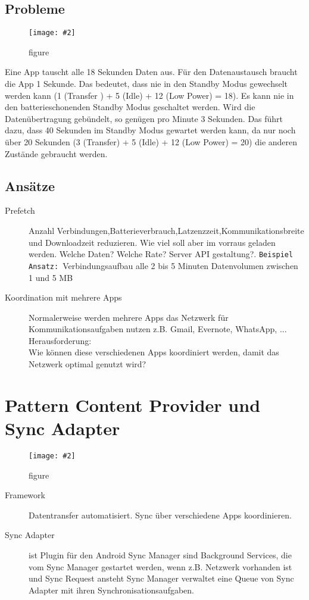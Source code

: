 \documentclass[a4paper,10pt,titlepage=false]{scrreprt}
\newcommand{\pic}[2][figure]{\begin{figure}[h]
 \centering
 \texttt{[image: \#2]}
 \caption{#1}
\end{figure}
}
\begin{document}
\subsection{Probleme}
\pic{rsmp.png}
 Eine App tauscht alle 18 Sekunden Daten aus. Für den Datenaustausch
braucht die App 1 Sekunde. Das bedeutet, dass nie in den Standby Modus
gewechselt werden kann (1 (Transfer ) + 5 (Idle) + 12 (Low Power) = 18).
Es kann nie in den batterieschonenden Standby Modus geschaltet werden.
 Wird die Datenübertragung gebündelt, so genügen pro Minute 3 Sekunden.
Das führt dazu, dass 40 Sekunden im Standby Modus gewartet werden
kann, da nur noch über 20 Sekunden (3 (Transfer) + 5 (Idle) + 12 (Low
Power) = 20) die anderen Zustände gebraucht werden.

\subsection{Ansätze}
\begin{description}
 \item[Prefetch]  Anzahl Verbindungen,Batterieverbrauch,Latzenzzeit,Kommunikationsbreite und Downloadzeit reduzieren. Wie viel soll aber im vorraus geladen werden.
 Welche Daten? Welche Rate? Server API gestaltung?. \texttt{Beispiel Ansatz: }Verbindungsaufbau alle 2 bis 5 Minuten
Datenvolumen zwischen 1 und 5 MB
\item[Koordination mit mehrere Apps]  Normalerweise werden mehrere Apps das
Netzwerk für Kommunikationsaufgaben nutzen z.B. Gmail, Evernote, WhatsApp, ...\\
Herausforderung:\\
Wie können diese verschiedenen Apps koordiniert
werden, damit das Netzwerk optimal genutzt wird?
\end{description}


\section{Pattern Content Provider und Sync Adapter}
\pic{apatternnet.png}
\begin{description}
\item[Framework] Datentransfer automatisiert. Sync über verschiedene Apps koordinieren.
\item[Sync Adapter] ist Plugin für den Android Sync Manager
sind Background Services, die vom Sync Manager
gestartet werden, wenn z.B. Netzwerk vorhanden ist
und Sync Request ansteht Sync Manager verwaltet eine Queue von Sync
Adapter mit ihren Synchronisationsaufgaben.
\end{description}
\end{document}
